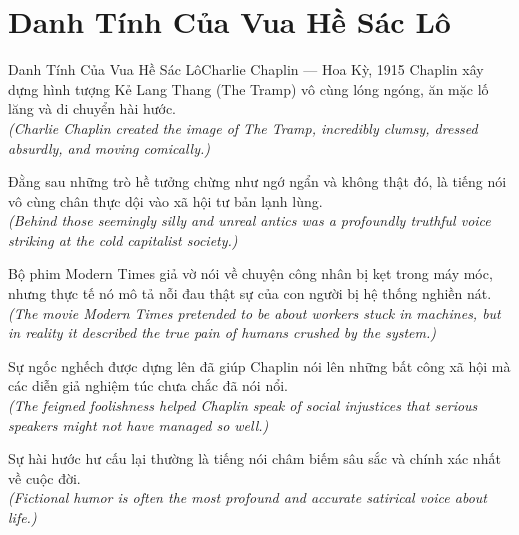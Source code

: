 \section{Danh Tính Của Vua Hề Sác Lô}
\begin{truyen}{Danh Tính Của Vua Hề Sác Lô}{Charlie Chaplin --- Hoa Kỳ, 1915}
 Chaplin xây dựng hình tượng Kẻ Lang Thang (The Tramp) vô cùng lóng ngóng, ăn mặc lố lăng và di chuyển hài hước.\\[4pt]
\textit{(Charlie Chaplin created the image of The Tramp, incredibly clumsy, dressed absurdly, and moving comically.)}

Đằng sau những trò hề tưởng chừng như ngớ ngẩn và không thật đó, là tiếng nói vô cùng chân thực dội vào xã hội tư bản lạnh lùng.\\[4pt]
\textit{(Behind those seemingly silly and unreal antics was a profoundly truthful voice striking at the cold capitalist society.)}

Bộ phim Modern Times giả vờ nói về chuyện công nhân bị kẹt trong máy móc, nhưng thực tế nó mô tả nỗi đau thật sự của con người bị hệ thống nghiền nát.\\[4pt]
\textit{(The movie Modern Times pretended to be about workers stuck in machines, but in reality it described the true pain of humans crushed by the system.)}

Sự ngốc nghếch được dựng lên đã giúp Chaplin nói lên những bất công xã hội mà các diễn giả nghiệm túc chưa chắc đã nói nổi.\\[4pt]
\textit{(The feigned foolishness helped Chaplin speak of social injustices that serious speakers might not have managed so well.)}

\end{truyen}
\begin{baihoc}
  Sự hài hước hư cấu lại thường là tiếng nói châm biếm sâu sắc và chính xác nhất về cuộc đời.\\[4pt]
  \textit{(Fictional humor is often the most profound and accurate satirical voice about life.)}
\end{baihoc}

